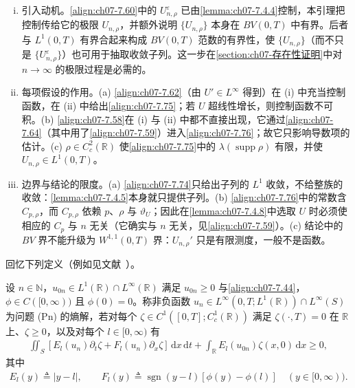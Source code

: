 ﻿\documentclass[../../main.tex]{subfiles}%
\begin{document}
\begin{remark}\label{remark:ch07-7.4.6极限}
\begin{enumerate}[(i)]
\item 引入动机。\eqref{align:ch07-7.60}中的 $U_{n,\rho}^\varepsilon$ 已由\cref{lemma:ch07-7.4.4}控制，本引理把控制传给它的极限 $U_{n,\rho}$，并额外说明 $\{U_{n,\rho}\}$ 本身在 $BV(0,T)$ 中有界。后者与 $L^1(0,T)$ 有界合起来构成 $BV(0,T)$ 范数的有界性，使 $\{U_{n,\rho}\}$（而不只是 $\{U_{n,\rho}^\varepsilon\}$）也可用于抽取收敛子列。这一步在\cref{section:ch07-存在性证明}中对 $n\to\infty$ 的极限过程是必需的。
\item 每项假设的作用。(a) \eqref{align:ch07-7.62}（由 $U'\in L^\infty$ 得到）在 (i) 中充当控制函数，在 (ii) 中给出\eqref{align:ch07-7.75}；若 $U$ 超线性增长，则控制函数不可积。(b) \eqref{align:ch07-7.58}在 (i) 与 (ii) 中都不直接出现，它通过\eqref{align:ch07-7.64}（其中用了\eqref{align:ch07-7.59}）进入\eqref{align:ch07-7.76}；故它只影响导数项的估计。(c) $\rho\in C^2_c(\mathbb{R})$ 使\eqref{align:ch07-7.75}中的 $\lambda(\operatorname{supp}\rho)$ 有限，并使 $U_{n,\rho}\in L^1(0,T)$。
\item 边界与结论的限度。(a) \eqref{align:ch07-7.74}只给出子列的 $L^1$ 收敛，不给整族的收敛：\cref{lemma:ch07-7.4.5}本身就只提供子列。(b) \eqref{align:ch07-7.76}中的常数含 $C_{p,\rho}$，而 $C_{p,\rho}$ 依赖 $p$、$\rho$ 与 $\vartheta_U$；因此在\cref{lemma:ch07-7.4.8}中选取 $U$ 时必须使相应的 $C_p$ 与 $n$ 无关（它确实与 $n$ 无关，见\eqref{align:ch07-7.59}）。(c) 结论中的 $BV$ 界不能升级为 $W^{1,1}(0,T)$ 界：$U_{n,\rho}'$ 只是有限测度，一般不是函数。
\end{enumerate}
\end{remark}

回忆下列定义（例如见文献~\cite{ref34}）。

\begin{definition}\label{definition:ch07-Pn熵解}
设 $n\in\mathbb{N}$，$u_{0n}\in L^1(\mathbb{R})\cap L^\infty(\mathbb{R})$ 满足 $u_{0n}\geqslant0$ 与\eqref{align:ch07-7.44}，$\phi\in C([0,\infty))$ 且 $\phi(0)=0$。称非负函数 $u_n\in L^\infty(0,T;L^1(\mathbb{R}))\cap L^\infty(S)$ 为问题 (Pn) 的熵解，若对每个 $\zeta\in C^1([0,T];C^1_c(\mathbb{R}))$ 满足 $\zeta(\cdot,T)=0$ 在 $\mathbb{R}$ 上、$\zeta\geqslant0$，以及对每个 $l\in[0,\infty)$ 有
\begin{align}
\iint_S[E_l(u_n)\partial_t\zeta+F_l(u_n)\partial_x\zeta]\,\mathrm{d}x\,\mathrm{d}t
+\int_{\mathbb{R}}E_l(u_{0n})\zeta(x,0)\,\mathrm{d}x\geqslant0, \label{align:ch07-7.77}
\end{align}
其中
\begin{align*}
E_l(y)\triangleq|y-l|,\qquad F_l(y)\triangleq\operatorname{sgn}(y-l)[\phi(y)-\phi(l)]\quad(y\in[0,\infty)).
\end{align*}
\end{definition}
\end{document}
